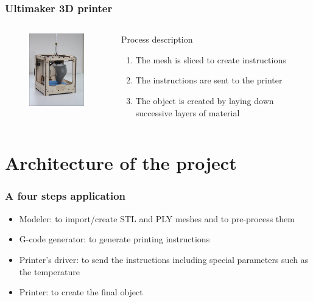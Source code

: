 \documentclass{beamer}
\begin{document}
\begin{frame}
	\frametitle{Ultimaker 3D printer}
	
	\begin{columns}[t]
  	\begin{column}{5cm}
  		\begin{figure}
		\includegraphics[width=4cm]{Ultimaker}	
		\end{figure}
  	\end{column}
  
  	\begin{column}{5cm}
  		\begin{block}{Process description}
  		\begin{enumerate}
  		\item The mesh is sliced to create instructions
  		\item The instructions are sent to the printer
  		\item The object is created by laying down successive layers of material
  		\end{enumerate}
 	 	\end{block}   
  	\end{column}
 	\end{columns}  
\end{frame}



\section{Architecture of the project}

\begin{frame}
	\frametitle{A four steps application}
	
	\begin{block}{}
		\begin{itemize}
			\item Modeler: to import/create STL and PLY meshes and to pre-process them
			\item G-code generator: to generate printing instructions
			\item Printer's driver: to send the instructions including special parameters such as the temperature
			\item Printer: to create the final object
		\end{itemize}
	\end{block}
	
\end{frame}
\end{document}

